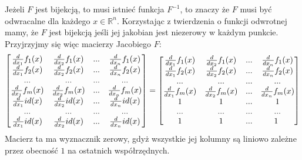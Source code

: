 \documentclass{article}[13pt]
\newcommand{\R}{\mathds{R}}
\begin{document}
Jeżeli $F$ jest bijekcją, to musi istnieć funkcja $F^{-1}$, to znaczy że $F$ musi być odwracalne dla każdego $x\in\R^n$. Korzystając z twierdzenia o funkcji odwrotnej mamy, że $F$ jest bijekcją jeśli jej jakobian jest niezerowy w każdym punkcie. Przyjrzyjmy się więc macierzy Jacobiego $F$:
\begin{align*}
    \begin{bmatrix}
        {d\over dx_1}f_1(x) & {d\over dx_2}f_1(x)&...&{d\over dx_n}f_1(x)\\
        {d\over dx_1}f_2(x) & {d\over dx_2}f_2(x)&...&{d\over dx_n}f_2(x)\\
        ... & ... & ... & ...\\
        {d\over dx_1}f_m(x) & {d\over dx_2}f_m(x)&...&{d\over dx_n}f_m(x)\\
        {d\over dx_1}id(x) & {d\over dx_{2}}id(x) &...&{d\over dx_n}id(x)\\
        ... & ... & ... & ...\\
        {d\over dx_1}id(x) & {d\over dx_{2}}id(x) &...&{d\over dx_n}id(x)\\
    \end{bmatrix}=
    \begin{bmatrix}
        {d\over dx_1}f_1(x) & {d\over dx_2}f_1(x)&...&{d\over dx_n}f_1(x)\\
        {d\over dx_1}f_2(x) & {d\over dx_2}f_2(x)&...&{d\over dx_n}f_2(x)\\
        ... & ... & ... & ...\\
        {d\over dx_1}f_m(x) & {d\over dx_2}f_m(x)&...&{d\over dx_n}f_m(x)\\
        1 & 1 &...&1\\
        ... & ... & ... & ...\\
        1 & 1&...&1\
    \end{bmatrix}
\end{align*}
Macierz ta ma wyznacznik zerowy, gdyż wszystkie jej kolumny są liniowo zależne przez obecność $1$ na ostatnich współrzędnych.


\end{document}

